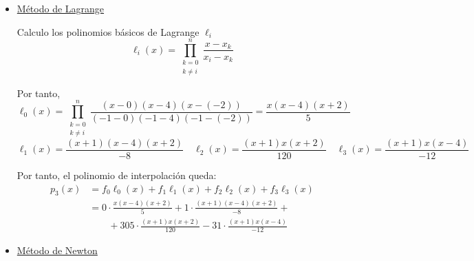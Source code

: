 \begin{ejercicio}
\begin{enumerate}
\begin{itemize}
            \item \underline{Método de Lagrange}
            
            Calculo los polinomios básicos de Lagrange $\ell_i$
            \begin{equation*}
                \ell_i(x) = \prod_{\substack{k=0\\k\neq i}}^n \frac{x-x_k}{x_i-x_k}
            \end{equation*}

            Por tanto,
            \begin{equation*}
                \ell_0(x) = \prod_{\substack{k=0\\k\neq i}}^n \frac{(x-0)(x-4)(x-(-2))}{(-1-0)(-1-4)(-1-(-2))} = \frac{x(x-4)(x+2)}{5}
            \end{equation*}
            \begin{equation*}
                \ell_1(x) = \frac{(x+1)(x-4)(x+2)}{-8}
                \quad
                \ell_2(x) = \frac{(x+1)x(x+2)}{120}
                \quad
                \ell_3(x) = \frac{(x+1)x(x-4)}{-12}
            \end{equation*}

            Por tanto, el polinomio de interpolación queda:
            \begin{equation*}
                \begin{split}
                    p_3(x) &= f_0 \ell_0(x) + f_1 \ell_1(x) + f_2 \ell_2(x) + f_3 \ell_3(x) \\
                    &= 0\cdot \frac{x(x-4)(x+2)}{5} +1\cdot \frac{(x+1)(x-4)(x+2)}{-8}
                    +\\&
                    \qquad +305\cdot \frac{(x+1)x(x+2)}{120} -31\cdot \frac{(x+1)x(x-4)}{-12}
                \end{split}
            \end{equation*}

            \item \underline{Método de Newton}


\end{itemize}
\end{enumerate}
\end{ejercicio}
